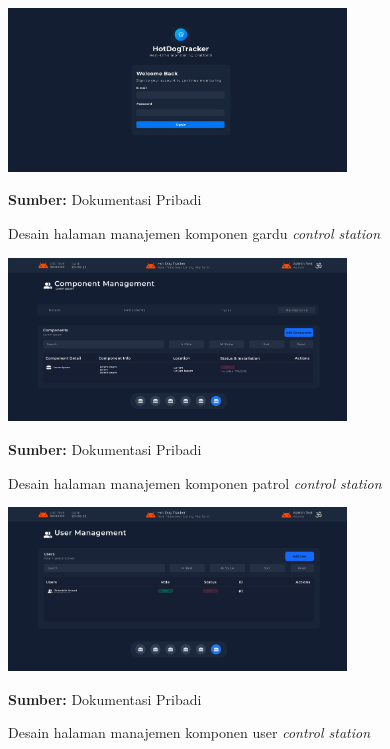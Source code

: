 \begin{figure}[H]
  \centering
  \includegraphics[width=0.8\textwidth]{gambar/bab3/auth-ui.png}
  \caption{Desain halaman manajemen komponen gardu \emph{control station}}
  \label{fig:control-station-robot-subtantion}
  \footnotesize{\textbf{Sumber:} Dokumentasi Pribadi}
\end{figure}


\begin{figure}[H]
  \centering
  \includegraphics[width=0.8\textwidth]{gambar/bab3/component-ui.png}
  \caption{Desain halaman manajemen komponen patrol \emph{control station}}
  \label{fig:control-station-robot-patrol}
  \footnotesize{\textbf{Sumber:} Dokumentasi Pribadi}
\end{figure}

\begin{figure}[H]
  \centering
  \includegraphics[width=0.8\textwidth]{gambar/bab3/user-ui.png}
  \caption{Desain halaman manajemen komponen user \emph{control station}}
  \label{fig:control-station-robot-user}
  \footnotesize{\textbf{Sumber:} Dokumentasi Pribadi}
\end{figure}

